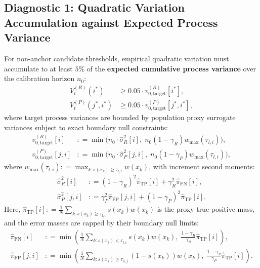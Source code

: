 \documentclass[11pt,a4paper]{article}
\newcommand{\coloneqq}{\mathrel{\mathop:}=}
\begin{document}
\subsection{Diagnostic 1: Quadratic Variation Accumulation against Expected Process Variance}
For non-anchor candidate thresholds, empirical quadratic variation must accumulate to at least $5\%$ of the \textbf{expected cumulative process variance} over the calibration horizon $n_0$:
\begin{align}
V_t^{(R)}(i^*) &\ge 0.05 \cdot v_{0, \text{target}}^{(R)}[i^*], \label{eq:check_var_r} \\
V_t^{(P)}(j^*, i^*) &\ge 0.05 \cdot v_{0, \text{target}}^{(P)}[j^*, i^*], \label{eq:check_var_p}
\end{align}
where target process variances are bounded by population proxy surrogate variances subject to exact boundary null constraints:
\begin{align}
v_{0, \text{target}}^{(R)}[i] &\coloneqq \min\Big(n_0 \cdot \hat{\sigma}_R^2[i], \; n_0 (1 - \gamma_R) w_{\max}(\tau_{l, i})\Big), \label{eq:v0_target_recall} \\
v_{0, \text{target}}^{(P)}[j, i] &\coloneqq \min\Big(n_0 \cdot \hat{\sigma}_P^2[j, i], \; n_0 (1 - \gamma_P) w_{\max}(\tau_{l, i})\Big), \label{eq:v0_target_precision}
\end{align}
where $w_{\max}(\tau_{l, i}) \coloneqq \max_{k: s(x_k) \ge \tau_{l, i}} w(x_k)$, with increment second moments:
\begin{align}
\hat{\sigma}_R^2[i] &\coloneqq (1 - \gamma_R)^2 \hat{\pi}_{\text{TP}}[i] + \gamma_R^2 \hat{\pi}_{\text{FN}}[i], \label{eq:sigma_R_def} \\
\hat{\sigma}_P^2[j, i] &\coloneqq \gamma_P^2 \hat{\pi}_{\text{FP}}[j, i] + (1 - \gamma_P)^2 \hat{\pi}_{\text{TP}}[i]. \label{eq:sigma_P_def}
\end{align}
Here, $\hat{\pi}_{\text{TP}}[i] \coloneqq \frac{1}{N}\sum_{k: s(x_k) \ge \tau_{l, i}} s(x_k) w(x_k)$ is the proxy true-positive mass, and the error masses are capped by their boundary null limits:
\begin{align}
\hat{\pi}_{\text{FN}}[i] &\coloneqq \min\left( \frac{1}{N}\sum_{k: s(x_k) < \tau_{l, i}} s(x_k) w(x_k), \; \frac{1 - \gamma_R}{\gamma_R} \hat{\pi}_{\text{TP}}[i] \right), \label{eq:pi_fn_cap} \\
\hat{\pi}_{\text{FP}}[j, i] &\coloneqq \min\left( \frac{1}{N}\sum_{k: s(x_k) \ge \tau_{u, j}} (1 - s(x_k)) w(x_k), \; \frac{1 - \gamma_P}{\gamma_P} \hat{\pi}_{\text{TP}}[i] \right). \label{eq:pi_fp_cap}
\end{align}
\end{document}
